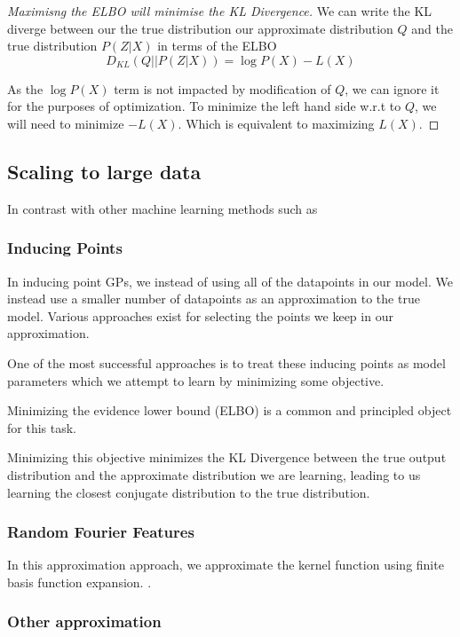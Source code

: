 \documentclass[12pt, a4paper]{report}
\theoremstyle{definition}
\theoremstyle{definition}
\theoremstyle{definition}
\begin{document}
\begin{proof}[Maximisng the ELBO will minimise the KL Divergence]
    We can write the KL diverge between our the true distribution our approximate distribution $Q$ and the true distribution $P(Z | X)$ in terms of the ELBO
    $$D_{KL} \left( Q || P \left(Z | X\right) \right) = \log P(X) - L(X)$$

    As the $\log P(X)$ term is not impacted by modification of $Q$, we can ignore it for the purposes of optimization. To minimize the left hand side w.r.t to $Q$, we will need to minimize $-L(X)$. Which is equivalent to maximizing $L(X)$.
\end{proof}

\subsection{Scaling to large data}

In contrast with other machine learning methods such as 

\subsubsection{Inducing Points}

In inducing point GPs, we instead of using all of the datapoints in our model. We instead use a smaller number of datapoints as an approximation to the true model. Various approaches exist for selecting the points we keep in our approximation.

One of the most successful approaches is to treat these inducing points as model parameters which we attempt to learn by minimizing some objective.

Minimizing the evidence lower bound (ELBO) is a common and principled object for this task.

Minimizing this objective minimizes the KL Divergence between the true output distribution and the approximate distribution we are learning, leading to us learning the closest conjugate distribution to the true distribution.

\subsubsection{Random Fourier Features}

In this approximation approach, we approximate the kernel function using finite basis function expansion. \cite{RFF}. 


\subsubsection{Other approximation}
\end{document}
